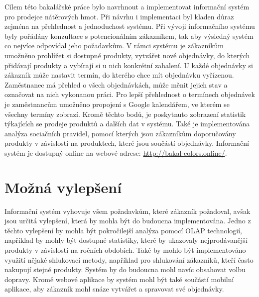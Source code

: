 Cílem této bakalářské práce bylo navrhnout a implementovat informační systém pro prodejce nátěrových hmot. Při návrhu i implementaci byl kladen důraz zejména na přehlednost a jednoduchost systému. Při vývoji informačního systému byly pořádány konzultace s potencionálním zákazníkem, tak aby výsledný systém co nejvíce odpovídal jeho požadavkům. V rámci systému je zákazníkům umožněno prohlížet si dostupné produkty, vytvářet nové objednávky, do kterých přidávají produkty a vybírají si u nich konkrétní zabalení. U každé objednávky si zákazník může nastavit termín, do kterého chce mít objednávku vyřízenou. Zaměstnanec má přehled o všech objednávkách, může měnit jejich stav a označovat na nich vykonanou práci. Pro lepší přehlednost o termínech objednávek je zaměstnancům umožněno propojení s Google kalendářem, ve kterém se všechny termíny zobrazí. Kromě těchto bodů, je poskytnuto zobrazení statistik týkajících se prodeje produktů a dalších dat v systému. Také je implementována analýza sociačních pravidel, pomocí kterých jsou zákazníkům doporučovány produkty v závislosti na produktech, které jsou součástí objednávky. Informační systém je dostupný online na webové adrese: \url{http://bakal-colors.online/}.

\section{Možná vylepšení}

Informační systém vyhovuje všem požadavkům, které zákazník požadoval, avšak jsou určitá vylepšení, která by mohla být do budoucna implementována. Jedno z těchto vylepšení by mohla být pokročilejší analýza pomocí OLAP technologií, například by mohly být dostupné statistiky, které by ukazovaly nejprodávanější produkty v závislosti na ročních obdobích. Také by mohlo být implementováno využití nějaké shlukovací metody, například pro shlukování zákazníků, kteří často nakupují stejné produkty. Systém by do budoucna mohl navíc obsahovat volbu dopravy. Kromě webové aplikace by systém mohl být také součástí mobilní aplikace, aby zákazník mohl snáze vytvářet a spravovat své objednávky.




